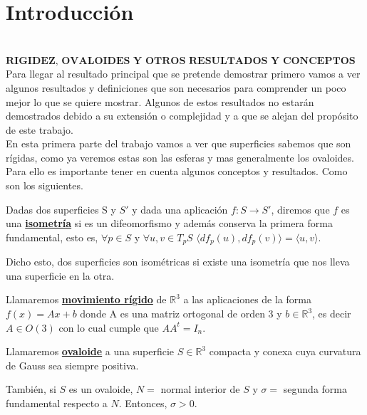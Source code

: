 \chapter*{Introducción}


${ }$\\
$\textbf{RIGIDEZ, OVALOIDES Y OTROS RESULTADOS Y CONCEPTOS}$
${ }$\\

Para llegar al resultado principal que se pretende demostrar primero vamos a ver algunos resultados y definiciones que son necesarios para comprender un poco mejor lo que se quiere mostrar. Algunos de estos resultados no estarán demostrados debido a su extensión o complejidad y a que se alejan del propósito de este trabajo.
${ }$\\

En esta primera parte del trabajo vamos a ver que superficies sabemos que son rígidas, como ya veremos estas son las esferas y mas generalmente los ovaloides. Para ello es importante tener en cuenta algunos conceptos y resultados. Como son los siguientes.

\begin{definicion}\label{def:isom} %
	Dadas dos superficies S y $S'$ y dada una aplicación $f : S \longrightarrow S'$, diremos que $f$ es una \underline{\textbf{isometría}} si es un difeomorfismo y además conserva la primera forma fundamental, esto es, $\forall p \in S$ y $\forall u,v \in T_p S$ $\langle df_p(u), df_p(v)\rangle = \langle u, v\rangle$.
\end{definicion}

Dicho esto, dos superficies son isométricas si existe una isometría que nos lleva una superficie en la otra.

\begin{definicion}
	Llamaremos \underline{\textbf{movimiento rígido}} de $\mathbb{R}^3$ a las aplicaciones de la forma $f(x) = Ax + b$ donde A es una matriz ortogonal de orden 3 y $b \in \mathbb{R}^3$, es decir $A \in O(3)$ con lo cual cumple que $AA^{t} = I_{n}$.
\end{definicion}

\begin{definicion}
	Llamaremos \underline{\textbf{ovaloide}} a una superficie $S \in \mathbb{R}^3$ compacta y conexa cuya curvatura de Gauss sea siempre positiva.
	
	También, si $S$ es un ovaloide, $N =$ normal interior de $S$ y $\sigma =$ segunda forma fundamental respecto a $N$. Entonces, $\sigma > 0$.
\end{definicion}

